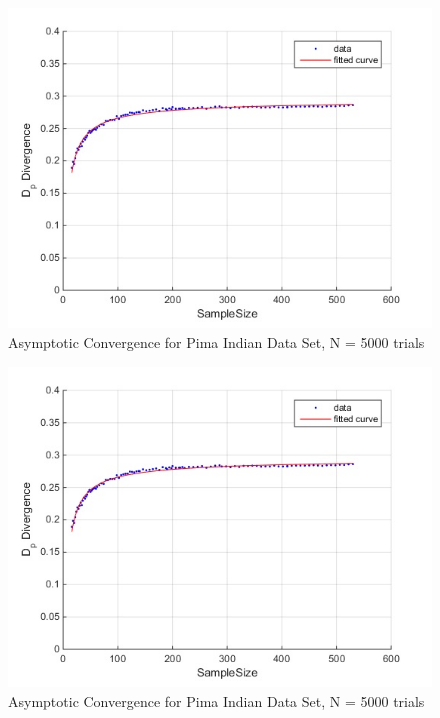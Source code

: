 \documentclass{article}
\begin{document}
		\begin{figure}[h]
			\caption{Asymptotic Convergence for Pima Indian Data Set, N = 5000 trials}
			\centering
			\includegraphics[scale=0.75]{dp_n5000}
		\end{figure}	
		
		\begin{figure}[h]
				\caption{Asymptotic Convergence for Pima Indian Data Set, N = 5000 trials}
				\centering
				\includegraphics[scale=0.75]{dp_n5000}
		\end{figure}	
			
\end{document}
